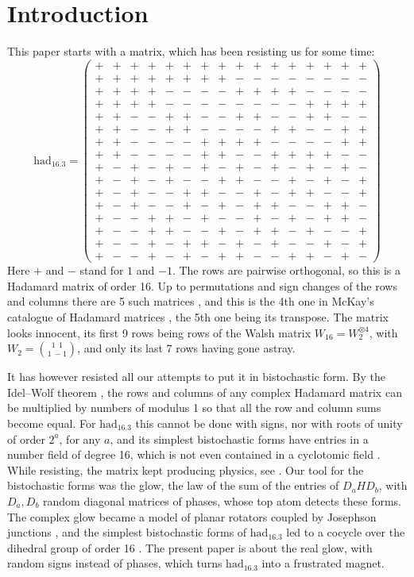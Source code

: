 \documentclass[11pt,a4paper]{article}
\theoremstyle{remark}
\begin{document}
\section*{Introduction}
This paper starts with a matrix, which has been resisting us for some time:
\begingroup\small\setlength{\arraycolsep}{2.2pt}
\[
\mathrm{had}_{16.3}=\begin{pmatrix}
+&+&+&+&+&+&+&+&+&+&+&+&+&+&+&+\\
+&+&+&+&+&+&+&+&-&-&-&-&-&-&-&-\\
+&+&+&+&-&-&-&-&+&+&+&+&-&-&-&-\\
+&+&+&+&-&-&-&-&-&-&-&-&+&+&+&+\\
+&+&-&-&+&+&-&-&+&+&-&-&+&+&-&-\\
+&+&-&-&+&+&-&-&-&-&+&+&-&-&+&+\\
+&+&-&-&-&-&+&+&+&+&-&-&-&-&+&+\\
+&+&-&-&-&-&+&+&-&-&+&+&+&+&-&-\\
+&-&+&-&+&-&+&-&+&-&+&-&+&-&+&-\\
+&-&+&-&+&-&-&+&+&-&-&+&-&+&-&+\\
+&-&+&-&-&+&+&-&-&+&-&+&+&-&-&+\\
+&-&+&-&-&+&-&+&-&+&+&-&-&+&+&-\\
+&-&-&+&+&-&+&-&-&+&-&+&-&+&+&-\\
+&-&-&+&+&-&-&+&-&+&+&-&+&-&-&+\\
+&-&-&+&-&+&+&-&+&-&+&-&-&+&-&+\\
+&-&-&+&-&+&-&+&+&-&-&+&+&-&+&-
\end{pmatrix}
\]
\endgroup
Here $+$ and $-$ stand for $1$ and $-1$. The rows are pairwise orthogonal, so this is a Hadamard matrix of order 16. Up to permutations and sign changes of the rows and columns there are 5 such matrices \cite{hal}, and this is the 4th one in McKay's catalogue of Hadamard matrices \cite{mck}, the 5th one being its transpose. The matrix looks innocent, its first 9 rows being rows of the Walsh matrix $W_{16}=W_2^{\otimes4}$, with $W_2=\binom{1\ \ 1}{1\ -1}$, and only its last 7 rows having gone astray.

It has however resisted all our attempts to put it in bistochastic form. By the Idel--Wolf theorem \cite{iwo}, the rows and columns of any complex Hadamard matrix can be multiplied by numbers of modulus 1 so that all the row and column sums become equal. For $\mathrm{had}_{16.3}$ this cannot be done with signs, nor with roots of unity of order $2^a$, for any $a$, and its simplest bistochastic forms have entries in a number field of degree 16, which is not even contained in a cyclotomic field \cite{com}. While resisting, the matrix kept producing physics, see \cite{cot}. Our tool for the bistochastic forms was the glow, the law of the sum of the entries of $D_aHD_b$, with $D_a,D_b$ random diagonal matrices of phases, whose top atom detects these forms. The complex glow became a model of planar rotators coupled by Josephson junctions \cite{cot}, and the simplest bistochastic forms of $\mathrm{had}_{16.3}$ led to a cocycle over the dihedral group of order 16 \cite{com}. The present paper is about the real glow, with random signs instead of phases, which turns $\mathrm{had}_{16.3}$ into a frustrated magnet.
\end{document}
